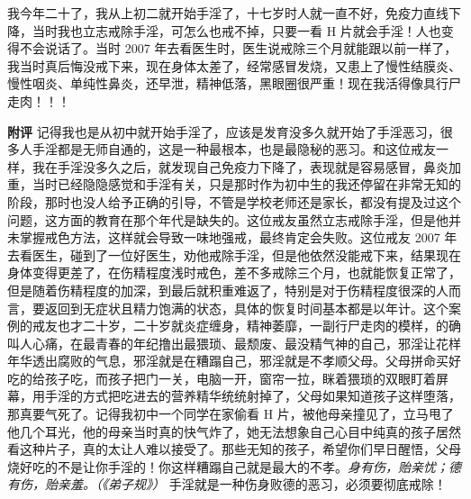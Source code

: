 \begin{case}
    我今年二十了，我从上初二就开始手淫了，十七岁时人就一直不好，免疫力直线下降，当时我也立志戒除手淫，可怎么也戒不掉，只要一看 H 片就会手淫！人也变得不会说话了。当时 2007 年去看医生时，医生说戒除三个月就能跟以前一样了，我当时真后悔没戒下来，现在身体太差了，经常感冒发烧，又患上了慢性结膜炎、慢性咽炎、单纯性鼻炎，还早泄，精神低落，黑眼圈很严重！现在我活得像具行尸走肉！！！

    \textbf{附评} 记得我也是从初中就开始手淫了，应该是发育没多久就开始了手淫恶习，很多人手淫都是无师自通的，这是一种最根本，也是最隐秘的恶习。和这位戒友一样，我在手淫没多久之后，就发现自己免疫力下降了，表现就是容易感冒，鼻炎加重，当时已经隐隐感觉和手淫有关，只是那时作为初中生的我还停留在非常无知的阶段，那时也没人给予正确的引导，不管是学校老师还是家长，都没有提及过这个问题，这方面的教育在那个年代是缺失的。这位戒友虽然立志戒除手淫，但是他并未掌握戒色方法，这样就会导致一味地强戒，最终肯定会失败。这位戒友 2007 年去看医生，碰到了一位好医生，劝他戒除手淫，但是他依然没能戒下来，结果现在身体变得更差了，在伤精程度浅时戒色，差不多戒除三个月，也就能恢复正常了，但是随着伤精程度的加深，到最后就积重难返了，特别是对于伤精程度很深的人而言，要返回到无症状且精力饱满的状态，具体的恢复时间基本都是以年计。这个案例的戒友也才二十岁，二十岁就炎症缠身，精神萎靡，一副行尸走肉的模样，的确叫人心痛，在最青春的年纪撸出最猥琐、最颓废、最没精气神的自己，邪淫让花样年华透出腐败的气息，邪淫就是在糟蹋自己，邪淫就是不孝顺父母。父母拼命买好吃的给孩子吃，而孩子把门一关，电脑一开，窗帘一拉，眯着猥琐的双眼盯着屏幕，用手淫的方式把吃进去的营养精华统统射掉了，父母如果知道孩子这样堕落，那真要气死了。记得我初中一个同学在家偷看 H 片，被他母亲撞见了，立马甩了他几个耳光，他的母亲当时真的快气炸了，她无法想象自己心目中纯真的孩子居然看这种片子，真的太让人难以接受了。那些无知的孩子，希望你们早日醒悟，父母烧好吃的不是让你手淫的！你这样糟蹋自己就是最大的不孝。\textit{身有伤，贻亲忧；德有伤，贻亲羞。（《弟子规》）} 手淫就是一种伤身败德的恶习，必须要彻底戒除！
\end{case}

